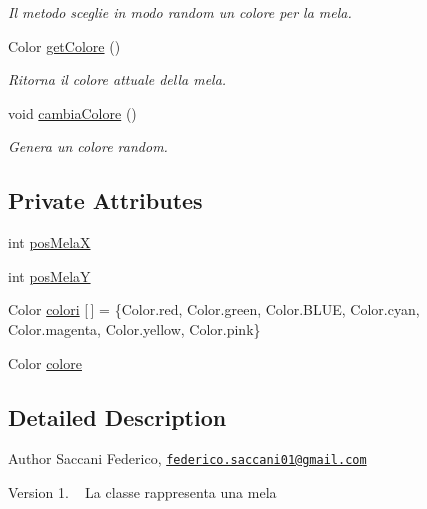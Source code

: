 \begin{DoxyCompactItemize}
\begin{DoxyCompactList}\small\item\em Il metodo sceglie in modo random un colore per la mela. \end{DoxyCompactList}\item 
Color \mbox{\hyperlink{class_snake_1_1game_1_1vipera_1_1mela_ae3f520a7be49ba6d662a1504fbe4acf3}{get\+Colore}} ()
\begin{DoxyCompactList}\small\item\em Ritorna il colore attuale della mela. \end{DoxyCompactList}\item 
void \mbox{\hyperlink{class_snake_1_1game_1_1vipera_1_1mela_a728ec55c7b71728d444fd811341f704c}{cambia\+Colore}} ()
\begin{DoxyCompactList}\small\item\em Genera un colore random. \end{DoxyCompactList}\end{DoxyCompactItemize}
\subsection*{Private Attributes}
\begin{DoxyCompactItemize}
\item 
int \mbox{\hyperlink{class_snake_1_1game_1_1vipera_1_1mela_a18097b5636ab8e5eaf99d18ffa609a06}{pos\+MelaX}}
\item 
int \mbox{\hyperlink{class_snake_1_1game_1_1vipera_1_1mela_ac5c78730de1bfb90e34ab5381ea70878}{pos\+MelaY}}
\item 
Color \mbox{\hyperlink{class_snake_1_1game_1_1vipera_1_1mela_a2af643ee90f15c4b4028c2dedf6a9da5}{colori}} \mbox{[}$\,$\mbox{]} = \{Color.\+red, Color.\+green, Color.\+B\+L\+UE, Color.\+cyan, Color.\+magenta, Color.\+yellow, Color.\+pink\}
\item 
Color \mbox{\hyperlink{class_snake_1_1game_1_1vipera_1_1mela_ada0bf0be39e4ad9d58f6e7c48f14c64a}{colore}}
\end{DoxyCompactItemize}


\subsection{Detailed Description}
\begin{DoxyAuthor}{Author}
Saccani Federico, \href{mailto:federico.saccani01@gmail.com}{\tt federico.\+saccani01@gmail.\+com} 
\end{DoxyAuthor}
\begin{DoxyVersion}{Version}
1. ~\newline
La classe rappresenta una mela 
\end{DoxyVersion}



